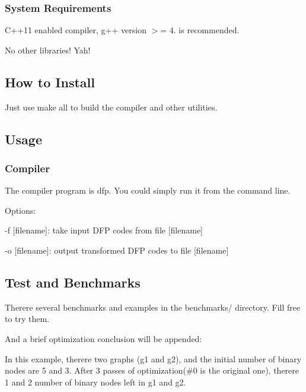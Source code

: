 \subsubsection*{System Requirements}


\begin{DoxyEnumerate}
\item C++11 enabled compiler, g++ version $>$= 4. is recommended.
\item No other libraries! Yah!
\end{DoxyEnumerate}

\subsection*{How to Install}

Just use {\ttfamily make all} to build the compiler and other utilities.

\subsection*{Usage}

\subsubsection*{Compiler}

The compiler program is {\ttfamily dfp}. You could simply run it from the command line.

Options\+:
\begin{DoxyEnumerate}
\item {\ttfamily -\/f \mbox{[}filename\mbox{]}}\+: take input D\+FP codes from file {\ttfamily \mbox{[}filename\mbox{]}}
\item {\ttfamily -\/o \mbox{[}filename\mbox{]}}\+: output transformed D\+FP codes to file {\ttfamily \mbox{[}filename\mbox{]}}
\end{DoxyEnumerate}

\subsection*{Test and Benchmarks}

There\textquotesingle{}re several benchmarks and examples in the {\ttfamily benchmarks/} directory. Fill free to try them.

And a brief optimization conclusion will be appended\+:




In this example, there\textquotesingle{}re two graphs (g1 and g2), and the initial number of binary nodes are 5 and 3. After 3 passes of optimization(\#0 is the original one), there\textquotesingle{}re 1 and 2 number of binary nodes left in g1 and g2. 